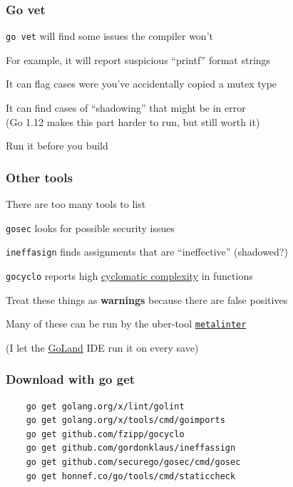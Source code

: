 \documentclass[handout,compress,t,11pt]{beamer}
\begin{document}
\begin{frame}[fragile]
    \frametitle{Go vet}
    \verb|go vet| will find some issues the compiler won't \par
    \vspace{\baselineskip}
    For example, it will report suspicious ``printf'' format strings \par
    \vspace{\baselineskip}
    It can flag cases were you've accidentally copied a mutex type \par
    \vspace{\baselineskip}
    It can find cases of ``shadowing'' that might be in error \\
    (Go 1.12 makes this part harder to run, but still worth it)\par
    \vspace{2\baselineskip}
    Run it before you build
\end{frame}

\begin{frame}[fragile]
    \frametitle{Other tools}
    There are too many tools to list \par
    \vspace{0.4\baselineskip}
    \verb|gosec| looks for possible security issues \par
    \vspace{0.4\baselineskip}
    \verb|ineffasign| finds assignments that are ``ineffective'' (shadowed?) \par
    \vspace{0.4\baselineskip}
    \verb|gocyclo| reports high \href{https://en.wikipedia.org/wiki/Cyclomatic_complexity}%
    {cyclomatic complexity} in functions\par
    \vspace{2\baselineskip}
    Treat these things as {\bf warnings} because there are false positives \par
    \vspace{\baselineskip}
    Many of these can be run by the uber-tool \href{https://github.com/alecthomas/gometalinter}%
    {\tt metalinter} \par
    (I let the \href{https://www.jetbrains.com/go/}{GoLand} IDE run it on every save)
\end{frame}

\begin{frame}[fragile]
    \frametitle{Download with go get}
\begin{verbatim}
    go get golang.org/x/lint/golint
    go get golang.org/x/tools/cmd/goimports
    go get github.com/fzipp/gocyclo
    go get github.com/gordonklaus/ineffassign
    go get github.com/securego/gosec/cmd/gosec
    go get honnef.co/go/tools/cmd/staticcheck
\end{verbatim}
\end{frame}
\end{document}
